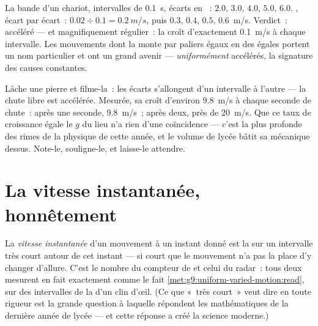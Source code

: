 \begin{example}\label{ex:g9:uniform-varied-motion:worked}
La bande d'un chariot, intervalles de \qty{0.1}{s}, écarts en
~: $2.0$, $3.0$, $4.0$, $5.0$, $6.0$. , écart par
écart~: $0.02 \div 0.1 = \qty{0.2}{m/s}$, puis $0.3$, $0.4$, $0.5$,
\qty{0.6}{m/s}. Verdict~: accéléré --- et magnifiquement régulier~:
la  croît d'exactement \qty{0.1}{m/s} à chaque intervalle. Les
mouvements dont la  monte par paliers égaux en des 
égales portent un nom particulier et ont un grand avenir ---
\emph{uniformément} accélérés, la signature des causes constantes.
\end{example}

\begin{example}\label{ex:g9:uniform-varied-motion:freefall}
Lâche une pierre et filme-la~: les écarts s'allongent d'un intervalle
à l'autre --- la chute libre est accélérée. Mesurée, sa  croît
d'environ \qty{9.8}{m/s} à chaque seconde de chute~: après une
seconde, \qty{9.8}{m/s}~; après deux, près de \qty{20}{m/s}. Que ce
taux de croissance égale le $g$ du lieu n'a rien d'une coïncidence ---
c'est la plus profonde des rimes de la physique de cette année, et le
volume de lycée bâtit sa mécanique dessus. Note-le, souligne-le, et
laisse-le attendre.
\end{example}

\section{La vitesse instantanée, honnêtement}

\begin{definition}\label{def:g9:uniform-varied-motion:instant}
La \emph{vitesse instantanée} d'un
mouvement à un instant donné est la  sur un intervalle
très court autour de cet instant --- si court que le mouvement n'a pas
la place d'y changer d'allure. C'est le nombre du compteur de 
et celui du radar~: tous deux mesurent en fait exactement comme le
fait \cref{met:g9:uniform-varied-motion:read}, sur des intervalles de
la  d'un clin d'œil. (Ce que «~très court~» veut dire en toute
rigueur est la grande question à laquelle répondent les mathématiques
de la dernière année de lycée --- et cette réponse a créé la science
moderne.)
\end{definition}

